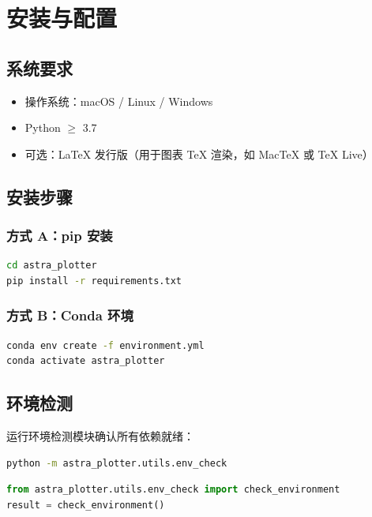 \documentclass[11pt,a4paper]{article}
\begin{document}
\section{安装与配置}

\subsection{系统要求}
\begin{itemize}
    \item 操作系统：macOS / Linux / Windows
    \item Python $\geq$ 3.7
    \item 可选：LaTeX 发行版（用于图表 TeX 渲染，如 MacTeX 或 TeX Live）
\end{itemize}

\subsection{安装步骤}

\subsubsection{方式 A：pip 安装}
\begin{lstlisting}[language=bash]
cd astra_plotter
pip install -r requirements.txt
\end{lstlisting}

\subsubsection{方式 B：Conda 环境}
\begin{lstlisting}[language=bash]
conda env create -f environment.yml
conda activate astra_plotter
\end{lstlisting}

\subsection{环境检测}
运行环境检测模块确认所有依赖就绪：
\begin{lstlisting}[language=bash]
python -m astra_plotter.utils.env_check
\end{lstlisting}

\begin{lstlisting}[language=python]
from astra_plotter.utils.env_check import check_environment
result = check_environment()
\end{lstlisting}
\end{document}

